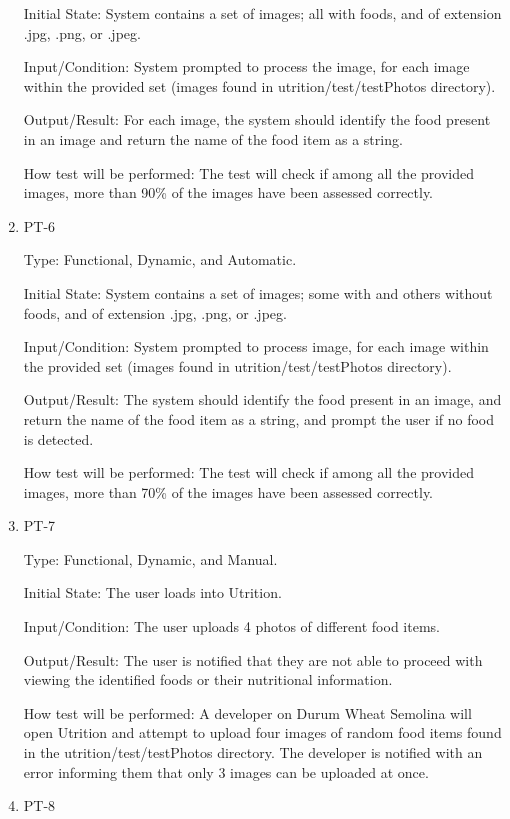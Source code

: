 \documentclass[12pt, titlepage]{article}
\begin{document}
\begin{enumerate}
		Initial State: System contains a set of images; all with foods, and of 
		extension .jpg, .png, or .jpeg.
		
		Input/Condition: System prompted to process the image, for each image 
		within the provided set (images found in utrition/test/testPhotos directory).
		
		Output/Result: For each image, the system should identify the food 
		present in an image and return the name of the food item as a string.
		
		How test will be performed: The test will check if among all the 
		provided images, more than 90\% of the images have been assessed 
		correctly.
		
		\item{PT-6}
		
		Type: Functional, Dynamic, and Automatic.
		
		Initial State: System contains a set of images; some with and others 
		without foods, and of extension .jpg, .png, or 
		.jpeg.
		
		Input/Condition: System prompted to process image, for each image 
		within the provided set (images found in utrition/test/testPhotos directory).
		
		Output/Result: The system should identify the food present in an image, 
		and return the name of the food item as a string, and prompt the user 
		if no food is detected.
		
		How test will be performed: The test will check if among all the 
		provided images, more than 70\% of the images have been assessed 
		correctly.
		
		\item{PT-7} 
		
		Type: Functional, Dynamic, and Manual.
		
		Initial State: The user loads into Utrition.
		
		Input/Condition: The user uploads 4 photos of different food items.
		
		Output/Result: The user is notified that they are not able to proceed with viewing the identified foods or their nutritional information.
		
		How test will be performed: A developer on Durum Wheat Semolina will open Utrition and attempt to upload four images of random food items found in the utrition/test/testPhotos directory. The developer is notified with an error informing them that only 3 images can be uploaded at once.
		
		\item{PT-8} 
		

\end{enumerate}
\end{document}

